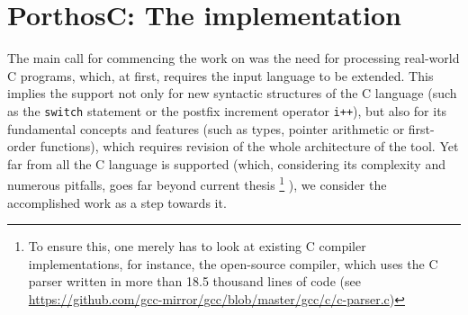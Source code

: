 \chapter{PorthosC: The implementation}
\label{ch:impl}

The main call for commencing the work on \porthos[2] was the need for processing real-world C programs, which, at first, requires the input language to be extended.
This implies the support not only for new syntactic structures of the C language (such as the \texttt{switch} statement or the postfix increment operator \texttt{i++}), but also for its fundamental concepts and features (such as types, pointer arithmetic or first-order functions), which requires revision of the whole architecture of the tool.
Yet far from all the C language is supported (which, considering its complexity and numerous pitfalls, goes far beyond current thesis%
%
\footnote{To ensure this, one merely has to look at existing C compiler implementations, for instance, the open-source  compiler, which uses the C parser written in more than 18.5 thousand lines of code (see \url{https://github.com/gcc-mirror/gcc/blob/master/gcc/c/c-parser.c})}%
%
), we consider the accomplished work as a step towards it.





